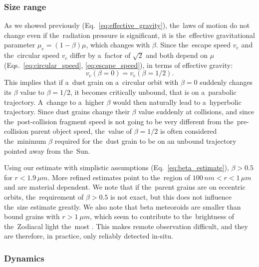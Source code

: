 \subsubsection{Size range}

As we showed previously (Eq.~\ref{eq:effective_gravity}), the~laws of motion do not change even if the~radiation pressure is significant, it is the~effective gravitational parameter $\mu_{e} = (1-\beta) \mu$, which changes with $\beta$. Since the~escape speed $v_e$ and the~circular speed $v_c$ differ by a~factor of $\sqrt{2}$ and both depend on $\mu$ (Eqs.~\ref{eq:circular_speed}, \ref{eq:escape_speed}), in terms of effective gravity:
\begin{equation}
    v_c(\beta=0) = v_e(\beta=1/2).
\end{equation}
This implies that if a~dust grain on a~circular orbit with $\beta=0$ suddenly changes its $\beta$ value to $\beta = 1/2$, it becomes critically unbound, that is on a~parabolic trajectory. A~change to a~higher $\beta$ would then naturally lead to a~hyperbolic trajectory. Since dust grains change their $\beta$ value suddenly at collisions, and since the~post-collision fragment speed is not going to be very different from the~pre-collision parent object speed, the~value of $\beta=1/2$ is often considered the~minimum $\beta$ required for the~dust grain to be on an unbound trajectory pointed away from the~Sun.

Using our estimate with simplistic assumptions (Eq.~\ref{eq:beta_estimate}), $\beta > 0.5$ for $r < 1.9 \, \si{\mu m}$. More refined estimates \citep{kimura2003composition} point to the~region of $100 \, \si{nm} < r < 1 \, \si{\mu m}$ and are material dependent. We note that if the~parent grains are on eccentric orbits, the~requirement of $\beta > 0.5$ is not exact, but this does not influence the~size estimate greatly. We also note that beta meteoroids are smaller than bound grains with $r>\SI{1}{\mu m}$, which seem to contribute to the~brightness of the~Zodiacal light the~most \citep{leinert1981zodiacal}. This makes remote observation difficult, and they are therefore, in practice, only reliably detected in-situ.

\subsubsection{Dynamics}

